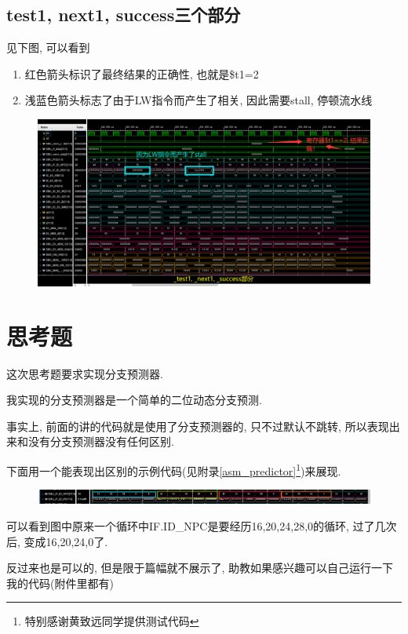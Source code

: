 \documentclass[UTF8]{article}
\begin{document}
\subsection{test1, next1, success三个部分}
见下图, 可以看到
\begin{enumerate}
	\item 红色箭头标识了最终结果的正确性, 也就是\$t1=2
	\item 浅蓝色箭头标志了由于LW指令而产生了相关, 因此需要stall, 停顿流水线
\end{enumerate}
\begin{figure}[H]
	\centering
	\includegraphics[width=\linewidth]{test1_next1_success.png}
\end{figure}

\section{思考题}
这次思考题要求实现分支预测器.\par
我实现的分支预测器是一个简单的二位动态分支预测.\par
事实上, 前面的讲的代码就是使用了分支预测器的, 只不过默认不跳转, 所以表现出来和没有分支预测器没有任何区别.\par
下面用一个能表现出区别的示例代码(见附录\ref{asm_predictor}\footnote{特别感谢黄致远同学提供测试代码})来展现.\par
\begin{figure}[H]
	\centering
	\includegraphics[width=\linewidth]{predictor.png}
\end{figure}
可以看到图中原来一个循环中IF.ID\_NPC是要经历16,20,24,28,0的循环, 过了几次后, 变成16,20,24,0了.\par
反过来也是可以的, 但是限于篇幅就不展示了, 助教如果感兴趣可以自己运行一下我的代码(附件里都有)
\end{document}
